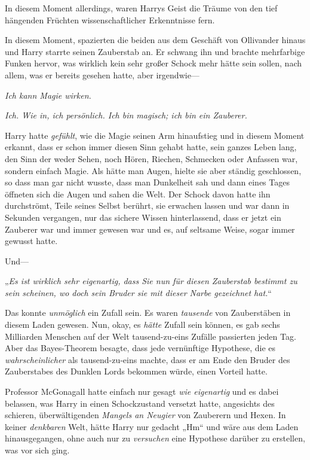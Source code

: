 {In diesem Moment allerdings, waren Harrys Geist die Träume von den tief hängenden Früchten wissenschaftlicher Erkenntnisse fern.

In diesem Moment, spazierten die beiden aus dem Geschäft von Ollivander hinaus und Harry starrte seinen Zauberstab an. Er schwang ihn und brachte mehrfarbige Funken hervor, was wirklich kein sehr großer Schock mehr hätte sein sollen, nach allem, was er bereits gesehen hatte, aber irgendwie—

\emph{Ich kann Magie wirken.}

\emph{Ich. Wie in, ich persönlich. Ich bin magisch; ich bin ein Zauberer.}

Harry hatte \emph{gefühlt}, wie die Magie seinen Arm hinaufstieg und in diesem Moment erkannt, dass er schon immer diesen Sinn gehabt hatte, sein ganzes Leben lang, den Sinn der weder Sehen, noch Hören, Riechen, Schmecken oder Anfassen war, sondern einfach Magie. Als hätte man Augen, hielte sie aber ständig geschlossen, so dass man gar nicht wusste, dass man Dunkelheit sah und dann eines Tages öffneten sich die Augen und sahen die Welt. Der Schock davon hatte ihn durchströmt, Teile seines Selbst berührt, sie erwachen lassen und war dann in Sekunden vergangen, nur das sichere Wissen hinterlassend, dass er jetzt ein Zauberer war und immer gewesen war und es, auf seltsame Weise, sogar immer gewusst hatte.

Und—

„\emph{Es ist wirklich sehr eigenartig, dass Sie nun für diesen Zauberstab bestimmt zu sein scheinen, wo doch sein Bruder sie mit dieser Narbe gezeichnet hat.}“

Das konnte \emph{unmöglich} ein Zufall sein. Es waren \emph{tausende} von Zauberstäben in diesem Laden gewesen. Nun, okay, es \emph{hätte} Zufall sein können, es gab sechs Milliarden Menschen auf der Welt tausend-zu-eins Zufälle passierten jeden Tag. Aber das Bayes-Theorem besagte, dass jede vernünftige Hypothese, die es \emph{wahrscheinlicher} als tausend-zu-eins machte, dass er am Ende den Bruder des Zauberstabes des Dunklen Lords bekommen würde, einen Vorteil hatte.

Professor McGonagall hatte einfach nur gesagt \emph{wie eigenartig} und es dabei belassen, was Harry in einen Schockzustand versetzt hatte, angesichts des schieren, überwältigenden \emph{Mangels an Neugier} von Zauberern und Hexen. In keiner \emph{denkbaren} Welt, hätte Harry nur gedacht „Hm“ und wäre aus dem Laden hinausgegangen, ohne auch nur zu \emph{versuchen} eine Hypothese darüber zu erstellen, was vor sich ging.

}

